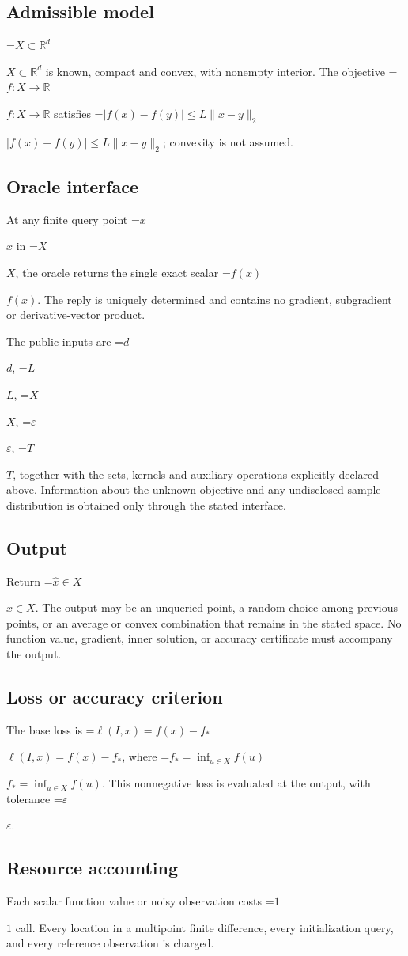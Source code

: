 \documentclass[10pt,a4paper]{article}
\newcommand{\AtlasMath}[1]{\par\begingroup\centering\setbox0=\hbox{$\displaystyle #1$}\ifdim\wd0>1.4\linewidth\typeout{ATLAS WIDE FORMULA: \the\wd0}\fi\ifdim\wd0>\linewidth\resizebox{\linewidth}{!}{\box0}\else\box0\fi\par\endgroup}
\newcommand{\AtlasInlineMath}[1]{\begingroup\setbox0=\hbox{$#1$}\ifdim\wd0>.4\linewidth\endgroup\AtlasMath{#1}\else\endgroup$#1$\fi}
\begin{document}
\subsection{Admissible model}
\AtlasInlineMath{X\subset\mathbb{R}^d} is known, compact and convex, with nonempty interior. The objective \AtlasInlineMath{f:X\to\mathbb{R}} satisfies \AtlasInlineMath{|f(x)-f(y)|\le L\|x-y\|_2}; convexity is not assumed.

\subsection{Oracle interface}
At any finite query point \AtlasInlineMath{x} in \AtlasInlineMath{X}, the oracle returns the single exact scalar \AtlasInlineMath{f(x)}. The reply is uniquely determined and contains no gradient, subgradient or derivative-vector product.

The public inputs are \AtlasInlineMath{d}, \AtlasInlineMath{L}, \AtlasInlineMath{X}, \AtlasInlineMath{\varepsilon}, \AtlasInlineMath{T}, together with the sets, kernels and auxiliary operations explicitly declared above. Information about the unknown objective and any undisclosed sample distribution is obtained only through the stated interface.

\subsection{Output}
Return \AtlasInlineMath{\widehat{x}\in X}. The output may be an unqueried point, a random choice among previous points, or an average or convex combination that remains in the stated space. No function value, gradient, inner solution, or accuracy certificate must accompany the output.

\subsection{Loss or accuracy criterion}
The base loss is \AtlasInlineMath{\ell(I,x)=f(x)-f_*}, where \AtlasInlineMath{f_*=\inf_{u\in X}f(u)}. This nonnegative loss is evaluated at the output, with tolerance \AtlasInlineMath{\varepsilon}.

\subsection{Resource accounting}
Each scalar function value or noisy observation costs \AtlasInlineMath{1} call. Every location in a multipoint finite difference, every initialization query, and every reference observation is charged.
\end{document}
